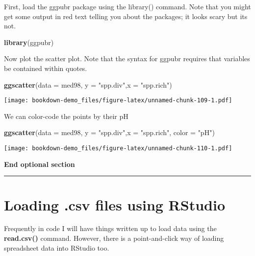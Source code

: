 \documentclass[]{book}
\newenvironment{Shaded}{\begin{snugshade}}{\end{snugshade}}
\newcommand{\KeywordTok}[1]{\textcolor[rgb]{0.13,0.29,0.53}{\textbf{#1}}}
\newcommand{\DataTypeTok}[1]{\textcolor[rgb]{0.13,0.29,0.53}{#1}}
\newcommand{\StringTok}[1]{\textcolor[rgb]{0.31,0.60,0.02}{#1}}
\newcommand{\NormalTok}[1]{#1}
\theoremstyle{definition}
\theoremstyle{definition}
\theoremstyle{definition}
\theoremstyle{remark}
\begin{document}
First, load the ggpubr package using the library() command. Note that
you might get some output in red text telling you about the packages; it
looks scary but its not.

\begin{Shaded}
\begin{Highlighting}[]
\KeywordTok{library}\NormalTok{(ggpubr)}
\end{Highlighting}
\end{Shaded}

Now plot the scatter plot. Note that the syntax for ggpubr requires that
variables be contained within quotes.

\begin{Shaded}
\begin{Highlighting}[]
\KeywordTok{ggscatter}\NormalTok{(}\DataTypeTok{data =}\NormalTok{ med98, }\DataTypeTok{y =} \StringTok{"spp.div"}\NormalTok{,}\DataTypeTok{x =} \StringTok{"spp.rich"}\NormalTok{)}
\end{Highlighting}
\end{Shaded}

\texttt{[image: bookdown-demo\_files/figure-latex/unnamed-chunk-109-1.pdf]}

We can color-code the points by their pH

\begin{Shaded}
\begin{Highlighting}[]
\KeywordTok{ggscatter}\NormalTok{(}\DataTypeTok{data =}\NormalTok{ med98, }\DataTypeTok{y =} \StringTok{"spp.div"}\NormalTok{,}\DataTypeTok{x =} \StringTok{"spp.rich"}\NormalTok{, }\DataTypeTok{color =} \StringTok{"pH"}\NormalTok{)}
\end{Highlighting}
\end{Shaded}

\texttt{[image: bookdown-demo\_files/figure-latex/unnamed-chunk-110-1.pdf]}

\textbf{End optional section}

\begin{center}\rule{0.5\linewidth}{\linethickness}\end{center}

\section{\texorpdfstring{Loading .csv files using RStudio
\protect\hyperlink{section-3}{}}{Loading .csv files using RStudio }}\label{loading-.csv-files-using-rstudio}

Frequently in code I will have things written up to load data using the
\textbf{read.csv()} command. However, there is a point-and-click way of
loading spreadsheet data into RStudio too.
\end{document}
